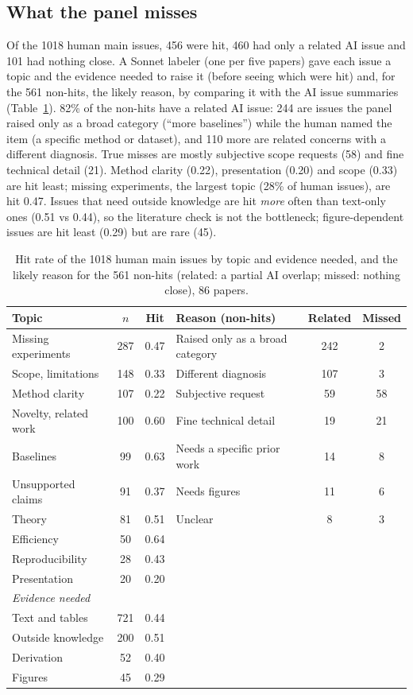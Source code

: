 \documentclass[11pt,a4paper]{article}
\begin{document}
\subsection{What the panel misses}\label{sec:misses}
Of the 1018 human main issues, 456 were hit, 460 had only a
related AI issue and 101 had nothing close. A Sonnet labeler (one per five papers) gave each
issue a topic and the evidence needed to raise it (before seeing which were hit) and, for the 561
non-hits, the likely reason, by comparing it with the AI issue summaries (Table~\ref{tab:misses}).
82\% of the non-hits have a related AI issue: 244 are issues the panel raised only as a broad
category (``more baselines'') while the human named the item (a specific method or dataset), and
110 more are related concerns with a different diagnosis. True misses are mostly subjective scope
requests (58) and fine technical detail (21). Method clarity (0.22), presentation (0.20) and
scope (0.33) are hit least; missing experiments, the largest topic (28\% of human issues), are hit
0.47. Issues that need outside knowledge are hit \emph{more} often than text-only ones (0.51 vs
0.44), so the literature check is not the bottleneck; figure-dependent issues are hit least
(0.29) but are rare (45).

\begin{table}[h]
\centering
\small
\caption{Hit rate of the 1018 human main issues by topic and evidence needed, and the likely reason for
the 561 non-hits (related: a partial AI overlap; missed: nothing close), 86 papers.}\label{tab:misses}
\begin{tabular}{lcc@{\qquad}lcc}
\toprule
Topic & $n$ & Hit & Reason (non-hits) & Related & Missed\\
\midrule
Missing experiments & 287 & 0.47 & Raised only as a broad category & 242 & 2\\
Scope, limitations & 148 & 0.33 & Different diagnosis & 107 & 3\\
Method clarity & 107 & 0.22 & Subjective request & 59 & 58\\
Novelty, related work & 100 & 0.60 & Fine technical detail & 19 & 21\\
Baselines & 99 & 0.63 & Needs a specific prior work & 14 & 8\\
Unsupported claims & 91 & 0.37 & Needs figures & 11 & 6\\
Theory & 81 & 0.51 & Unclear & 8 & 3\\
Efficiency & 50 & 0.64 & & & \\
Reproducibility & 28 & 0.43 & & & \\
Presentation & 20 & 0.20 & & & \\
\midrule
\multicolumn{3}{l}{\emph{Evidence needed}} & & & \\
Text and tables & 721 & 0.44 & & & \\
Outside knowledge & 200 & 0.51 & & & \\
Derivation & 52 & 0.40 & & & \\
Figures & 45 & 0.29 & & & \\
\bottomrule
\end{tabular}
\end{table}
\end{document}
